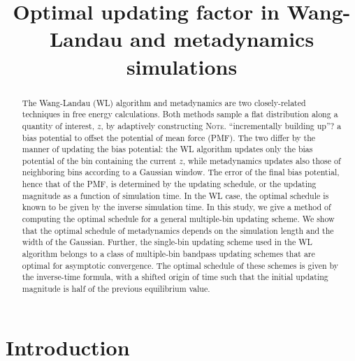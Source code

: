 \documentclass[reprint, floatfix]{revtex4-1}
\newcommand{\note}[1]{{\color{DarkGreen}\footnotesize \textsc{Note.} #1}}
\begin{document}
\title{Optimal updating factor in Wang-Landau and metadynamics simulations}



\begin{abstract}
  The Wang-Landau (WL) algorithm and metadynamics
  are two closely-related techniques
  in free energy calculations.
  Both methods sample a flat distribution
  along a quantity of interest, $z$,
  by adaptively constructing
  \note{``incrementally building up''?}%
  a bias potential to offset
  the potential of mean force (PMF).
  The two differ by
  the manner of updating the bias potential:
  the WL algorithm updates only
  the bias potential of
  the bin containing the current $z$,
  while metadynamics updates also
  those of neighboring bins according to
  a Gaussian window.
  The error of the final bias potential,
  hence that of the PMF,
  is determined by the updating schedule,
  or the updating magnitude
  as a function of simulation time.
  In the WL case,
  the optimal schedule
  is known to be given by
  the inverse simulation time.
  In this study,
  we give a method of computing the optimal schedule
  for a general multiple-bin updating scheme.
  We show that the optimal schedule of metadynamics
  depends on the simulation length
  and the width of the Gaussian.
  Further,
  the single-bin updating scheme
  used in the WL algorithm
  belongs to a class of multiple-bin bandpass updating schemes
  that are optimal for asymptotic convergence.
  The optimal schedule of these schemes
  is given by the inverse-time formula,
  with a shifted origin of time such that
  the initial updating magnitude is half of
  the previous equilibrium value.
\end{abstract}

\maketitle



\section{Introduction}
\end{document}
